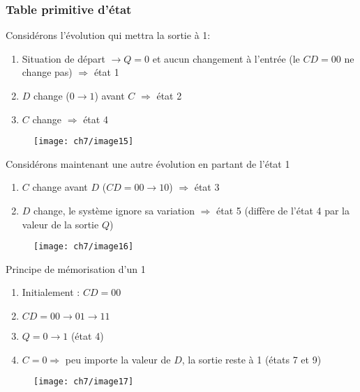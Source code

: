 \subsubsection{Table primitive d'état}
\begin{minipage}{.5\textwidth}
	Considérons l'évolution qui mettra la sortie à 1:
\begin{enumerate}
	\item Situation de départ $\rightarrow Q=0$ et aucun changement à l'entrée (le $CD=00$ ne change pas) $\Rightarrow$ état 1
	\item $D$ change ($0\rightarrow 1$) avant $C$ $\Rightarrow$ état 2
	\item $C$ change $\Rightarrow$ état 4
\end{enumerate}
\end{minipage}
\vspace{-2.9cm}
\begin{minipage}{.5\textwidth}
	\begin{figure}[H]
		\centering
		\texttt{[image: ch7/image15]}
	\end{figure}
\end{minipage}
\begin{minipage}{.5\textwidth}
	Considérons maintenant une autre évolution en partant de l'état 1
	\begin{enumerate}
		\item $C$ change avant $D$ ($CD=00\rightarrow 10$) $\Rightarrow$ état 3
		\item $D$ change, le système ignore sa variation $\Rightarrow$ état 5 (diffère de l'état 4 par la valeur de la sortie $Q$)
	\end{enumerate}
\end{minipage}
\begin{minipage}{.5\textwidth}
	\begin{figure}[H]
		\centering
		\texttt{[image: ch7/image16]}
	\end{figure}
\end{minipage}

\begin{minipage}{.5\textwidth}
	Principe de mémorisation d'un 1
	\begin{enumerate}
		\item Initialement : $CD=00$
		\item $CD=00\rightarrow 01\rightarrow 11$
		\item $Q=0\rightarrow 1$ (état 4)
		\item $C=0 \Rightarrow$ peu importe la valeur de $D$, la sortie reste à 1 (états 7 et 9)
	\end{enumerate}
\end{minipage}
\begin{minipage}{.5\textwidth}
	\begin{figure}[H]
		\centering
		\texttt{[image: ch7/image17]}
	\end{figure}
\end{minipage}

